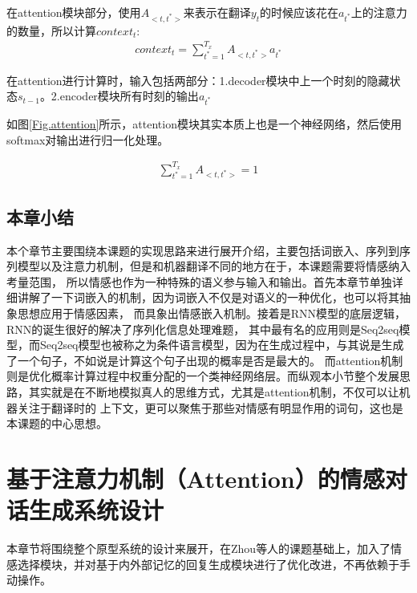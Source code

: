 \documentclass[supercite]{HustGraduPaper}
\theoremstyle{definition}
\begin{document}
在attention模块部分，使用$A_{<t,t^*>}$来表示在翻译$y_{t}$的时候应该花在$a_{t^*}$上的注意力的数量，所以计算$context_{t}$:
\begin{align}
  context_{t} = \sum_{t^*=1}^{T_x}{A_{<t,t^{*}>}}a_{t^*} \label{6}
\end{align}

在attention进行计算时，输入包括两部分：1.decoder模块中上一个时刻的隐藏状态$s_{t-1}$。2.encoder模块所有时刻的输出$a_{t^*}$

如图\ref{Fig.attention}所示，attention模块其实本质上也是一个神经网络，然后使用softmax对输出进行归一化处理。

\begin{align}
  \sum_{t^*=1}^{T_x}{A_{<t,t^{*}>}}=1 \label{7}
\end{align}

\subsection{本章小结}
本个章节主要围绕本课题的实现思路来进行展开介绍，主要包括词嵌入、序列到序列模型以及注意力机制，但是和机器翻译不同的地方在于，本课题需要将情感纳入考量范围，
所以情感也作为一种特殊的语义参与输入和输出。首先本章节单独详细讲解了一下词嵌入的机制，因为词嵌入不仅是对语义的一种优化，也可以将其抽象思想应用于情感因素，
而具象出情感嵌入机制。接着是RNN模型的底层逻辑，RNN的诞生很好的解决了序列化信息处理难题，
其中最有名的应用则是Seq2seq模型，而Seq2seq模型也被称之为条件语言模型，因为在生成过程中，与其说是生成了一个句子，不如说是计算这个句子出现的概率是否是最大的。
而attention机制则是优化概率计算过程中权重分配的一个类神经网络层。而纵观本小节整个发展思路，其实就是在不断地模拟真人的思维方式，尤其是attention机制，不仅可以让机器关注于翻译时的
上下文，更可以聚焦于那些对情感有明显作用的词句，这也是本课题的中心思想。

\section{基于注意力机制（Attention）的情感对话生成系统设计}
本章节将围绕整个原型系统的设计来展开，在Zhou\cite{DBLP:journals/corr/ZhouHZZL17}等人的课题基础上，加入了情感选择模块，并对基于内外部记忆的回复生成模块进行了优化改进，不再依赖于手动操作。
\end{document}
